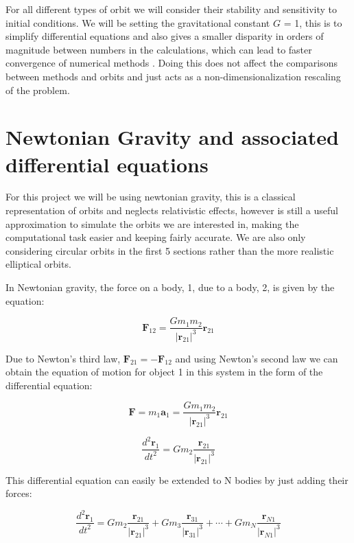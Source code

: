\documentclass[11pt]{article}
\begin{document}
\bigskip
For all different types of orbit we will consider their stability and sensitivity to initial conditions. We will be setting the gravitational constant $G$ = 1, this is to simplify differential equations and also gives a smaller disparity in orders of magnitude between numbers in the calculations, which can lead to faster convergence of numerical methods \cite{NbodyScipy}. Doing this does not affect the comparisons between methods and orbits and just acts as a non-dimensionalization rescaling of the problem.


\centering
\section{Newtonian Gravity and associated differential equations}
\raggedright

For this project we will be using newtonian gravity, this is a classical representation of orbits and neglects relativistic effects, however is still a useful approximation to simulate the orbits we are interested in, making the computational task easier and keeping fairly accurate. We are also only considering circular orbits in the first 5 sections rather than the more realistic elliptical orbits.
\bigskip

In Newtonian gravity, the force on a body, 1, due to a body, 2, is given by the equation:

$$
\textbf{F}_{12} = \frac{G m_1 m_2}{|\textbf{r}_{21}|^3} \textbf{r}_{21}
$$

\smallskip

Due to Newton's third law, $\textbf{F}_{21} = - \textbf{F}_{12}$ and using Newton's second law we can obtain the equation of motion for object 1 in this system in the form of the differential equation:

$$ \textbf{F} = m_1 \textbf{a}_1 = \frac{G m_1 m_2}{|\textbf{r}_{21}|^3} \textbf{r}_{21}$$

$$
\frac{d^2\textbf{r}_1}{dt^2} =  G m_2 \frac{\textbf{r}_{21}}{|\textbf{r}_{21}|^3}
$$

This differential equation can easily be extended to N bodies by just adding their forces:

$$
\frac{d^2\textbf{r}_1}{dt^2} =  G m_2 \frac{\textbf{r}_{21}}{|\textbf{r}_{21}|^3} + G m_3 \frac{\textbf{r}_{31}}{|\textbf{r}_{31}|^3} + \cdots + G m_N \frac{\textbf{r}_{N1}}{|\textbf{r}_{N1}|^3}
$$
\bigskip
\end{document}
